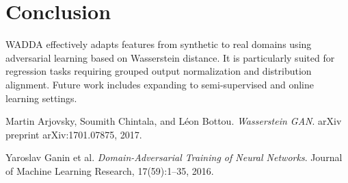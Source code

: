 \documentclass{article}
\begin{document}
\section{Conclusion}
WADDA effectively adapts features from synthetic to real domains using adversarial learning based on Wasserstein distance. It is particularly suited for regression tasks requiring grouped output normalization and distribution alignment. Future work includes expanding to semi-supervised and online learning settings.


\begin{thebibliography}{9}
Martin Arjovsky, Soumith Chintala, and Léon Bottou. 
\textit{Wasserstein GAN}. arXiv preprint arXiv:1701.07875, 2017.

Yaroslav Ganin et al.
\textit{Domain-Adversarial Training of Neural Networks}.
Journal of Machine Learning Research, 17(59):1–35, 2016.
\end{thebibliography}
\end{document}
